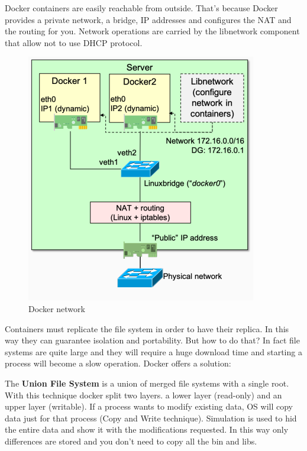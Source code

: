 Docker containers are easily reachable from outside. That's because Docker provides a private network, a bridge, IP addresses and configures the NAT and the routing for you. Network operations are carried by the libnetwork component that allow not to use DHCP protocol.
\begin{figure}[h!]
    \centering
    \includegraphics[scale=0.5]{images/docker private network.png}
    \caption{Docker network}
    \label{fig:dckrntwrk}
\end{figure}

Containers must replicate the file system in order to have their replica. In this way they can guarantee isolation and portability. But how to do that? In fact file systems are quite large and they will require a huge download time and starting a process will become a slow operation. Docker offers a solution:

 The \textbf{Union File System} is a union of merged file systems with a single root. With this technique docker split two layers. a lower layer (read-only) and an upper layer (writable).
If a process wants to modify existing data, OS will copy data just for that process (Copy and Write technique). Simulation is used to hid the entire data and show it with the modifications requested. In this way only differences are stored and you don't need to copy all the bin and libs.

